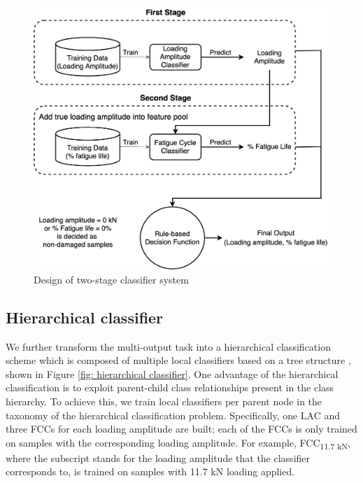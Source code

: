 \begin{figure}[tb]
    \centering
    \includegraphics[width=0.9\linewidth]{fig/two-stage_classifier.png}
    \caption{Design of two-stage classifier system}
    \label{fig: two-stage classifier}
\end{figure}

\subsection{Hierarchical classifier}
We further transform the multi-output task into a hierarchical classification scheme which is composed of multiple local classifiers based on a tree structure \cite{hierarchical-Silla2011}, shown in Figure \ref{fig: hierarchical classifier}. One advantage of the hierarchical classification is to exploit parent-child class relationships present in the class hierarchy. To achieve this, we train local classifiers per parent node in the taxonomy of the hierarchical classification problem. Specifically, one LAC and three FCCs for each loading amplitude are built; each of the FCCs is only trained on samples with the corresponding loading amplitude. For example, FCC\textsubscript{11.7 kN}, where the subscript stands for the loading amplitude that the classifier corresponds to, is trained on samples with 11.7 kN loading applied. 

